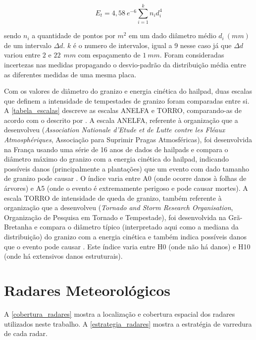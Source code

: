\begin{equation} \label{mezeix}
	E_t = 4,58\:e^{-6} \sum_{i=1}^{k} n_i d_i^4
\end{equation}

\noindent
sendo $n_i$ a quantidade de pontos por $m^2$ em um dado diâmetro médio $d_i\:(mm)$ de um intervalo $\Delta d$. $k$ é o numero de intervalos, igual a 9 nesse caso já que $\Delta d$ variou entre $2$ e $22\:\:mm$ com espaçamento de $1\:mm$. Foram consideradas incertezas nas medidas propagando o desvio-padrão da distribuição média entre as diferentes medidas de uma mesma placa.

Com os valores de diâmetro do granizo e energia cinética do hailpad, duas escalas que definem a intensidade de tempestades de granizo foram comparadas entre si. A \autoref{tabela_escalas} descreve as escalas ANELFA e TORRO, comparando-as de acordo com o descrito por . A escala ANELFA, referente à organização que a desenvolveu (\textit{Association Nationale d'Etude et de Lutte contre les Fléaux Atmosphériques}, Associação para Suprimir Pragas Atmosféricas), foi desenvolvida na França usando uma série de 16 anos de dados de hailpads e compara o diâmetro máximo do granizo com a energia cinética do hailpad, indicando possíveis danos (principalmente a plantações) que um evento com dado tamanho de granizo pode causar \cite{Dessens2007}. O índice varia entre A0 (onde ocorre danos à folhas de árvores) e A5 (onde o evento é extremamente perigoso e pode causar mortes). A escala TORRO de intensidade de queda de granizo, também referente à organização que a desenvolveu (\textit{Tornado and Storm Research Organisation}, Organização de Pesquisa em Tornado e Tempestade), foi desenvolvida na Grã-Bretanha e compara o diâmetro típico (interpretado aqui como a mediana da distribuição) do granizo com a energia cinética e também indica possíveis danos que o evento pode causar \cite{webb1986}. Este índice varia entre H0 (onde não há danos) e H10 (onde há extensivos danos estruturais).



\section{Radares Meteorológicos}\label{radar}

A \autoref{cobertura_radares} mostra a localização e cobertura espacial dos radares utilizados neste trabalho. A \autoref{estrategia_radares} mostra a estratégia de varredura de cada radar.

